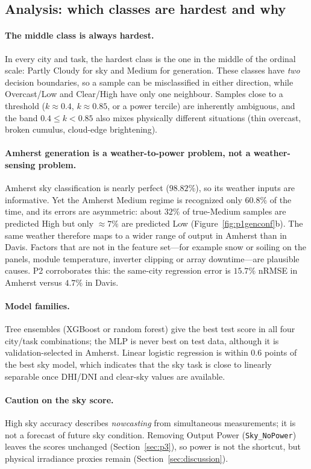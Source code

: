 \documentclass[11pt,letterpaper]{article}
\begin{document}
\subsection{Analysis: which classes are hardest and why}
\paragraph{The middle class is always hardest.} In every city and task, the hardest class is the
one in the middle of the ordinal scale: Partly Cloudy for sky and Medium for generation. These
classes have \emph{two} decision boundaries, so a sample can be misclassified in either direction,
while Overcast/Low and Clear/High have only one neighbour. Samples close to a threshold
($k\approx0.4$, $k\approx0.85$, or a power tercile) are inherently ambiguous, and the band
$0.4\le k<0.85$ also mixes physically different situations (thin overcast, broken cumulus,
cloud-edge brightening).

\paragraph{Amherst generation is a weather-to-power problem, not a weather-sensing problem.}
Amherst sky classification is nearly perfect ($98.82\%$), so its weather inputs are informative.
Yet the Amherst Medium regime is recognized only $60.8\%$ of the time, and its errors are
asymmetric: about $32\%$ of true-Medium samples are predicted High but only $\approx7\%$ are
predicted Low (Figure~\ref{fig:p1genconf}b). The same weather therefore maps to a wider range of
output in Amherst than in Davis. Factors that are not in the feature set---for example snow or
soiling on the panels, module temperature, inverter clipping or array downtime---are plausible
causes. P2 corroborates this: the same-city regression error is $15.7\%$ nRMSE in Amherst versus
$4.7\%$ in Davis.

\paragraph{Model families.} Tree ensembles (XGBoost or random forest) give the best test score in
all four city/task combinations; the MLP is never best on test data, although it is
validation-selected in Amherst. Linear logistic regression is within
$0.6$ points of the best sky model, which indicates that the sky task is close to linearly
separable once DHI/DNI and clear-sky values are available.

\paragraph{Caution on the sky score.} High sky accuracy describes \emph{nowcasting} from
simultaneous measurements; it is not a forecast of future sky condition. Removing Output Power
(\texttt{Sky\_NoPower}) leaves the scores unchanged (Section~\ref{sec:p3}), so power is not the
shortcut, but physical irradiance proxies remain (Section~\ref{sec:discussion}).
\FloatBarrier
\end{document}
